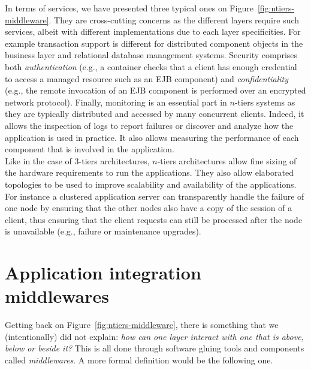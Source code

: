 In terms of services, we have presented three typical ones on Figure~\ref{fig:ntiers-middleware}. They are cross-cutting concerns as the different layers require such services, albeit with different implementations due to each layer specificities. For example transaction support is different for distributed component objects in the business layer and relational database management systems. Security comprises both \emph{authentication} (e.g., a container checks that a client has enough credential to access a managed resource such as an EJB component) and \emph{confidentiality} (e.g., the remote invocation of an EJB component is performed over an encrypted network protocol). Finally, monitoring is an essential part in $n$-tiers systems as they are typically distributed and accessed by many concurrent clients. Indeed, it allows the inspection of logs to report failures or discover and analyze how the application is used in practice. It also allows measuring the performance of each component that is involved in the application. \\

Like in the case of 3-tiers architectures, $n$-tiers architectures allow fine sizing of the hardware requirements to run the applications. They also allow elaborated topologies to be used to improve scalability and availability of the applications. For instance a clustered application server can transparently handle the failure of one node by ensuring that the other nodes also have a copy of the session of a client, thus ensuring that the client requests can still be processed after the node is unavailable (e.g., failure or maintenance upgrades).\\


\section{Application integration middlewares}


Getting back on Figure~\ref{fig:ntiers-middleware}, there is something that we (intentionally) did not explain: \textit{how can one layer interact with one that is above, below or beside it?}
%
This is all done through software gluing tools and components called \emph{middlewares}. A more formal definition would be the following one.\\

